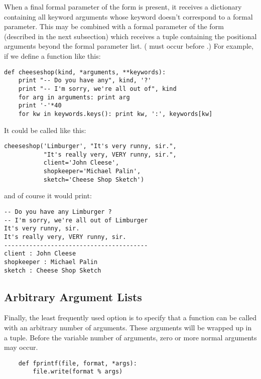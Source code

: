 When a final formal parameter of the form  is
present, it receives a dictionary containing all keyword arguments
whose keyword doesn't correspond to a formal parameter.  This may be
combined with a formal parameter of the form 
(described in the next subsection) which receives a tuple containing
the positional arguments beyond the formal parameter list.
( must occur before .)  For
example, if we define a function like this:

\begin{verbatim}
def cheeseshop(kind, *arguments, **keywords):
    print "-- Do you have any", kind, '?'
    print "-- I'm sorry, we're all out of", kind
    for arg in arguments: print arg
    print '-'*40
    for kw in keywords.keys(): print kw, ':', keywords[kw]
\end{verbatim}

It could be called like this:

\begin{verbatim}
cheeseshop('Limburger', "It's very runny, sir.",
           "It's really very, VERY runny, sir.",
           client='John Cleese',
           shopkeeper='Michael Palin',
           sketch='Cheese Shop Sketch')
\end{verbatim}

and of course it would print:

\begin{verbatim}
-- Do you have any Limburger ?
-- I'm sorry, we're all out of Limburger
It's very runny, sir.
It's really very, VERY runny, sir.
----------------------------------------
client : John Cleese
shopkeeper : Michael Palin
sketch : Cheese Shop Sketch
\end{verbatim}

\subsection{Arbitrary Argument Lists}

Finally, the least frequently used option is to specify that a
function can be called with an arbitrary number of arguments.  These
arguments will be wrapped up in a tuple.  Before the variable number
of arguments, zero or more normal arguments may occur.

\begin{verbatim}
    def fprintf(file, format, *args):
        file.write(format % args)
\end{verbatim}

